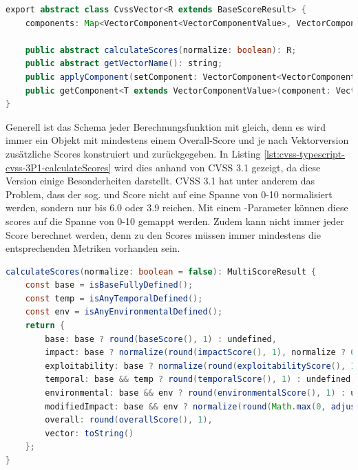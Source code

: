 \begin{lstlisting}[language=Java, label={lst:cvss-typescript-cvss-vector-class-attributes}, caption={CvssVector Klasse in TypeScript}, basicstyle=\scriptsize]
export abstract class CvssVector<R extends BaseScoreResult> {
    components: Map<VectorComponent<VectorComponentValue>, VectorComponentValue>;

    public abstract calculateScores(normalize: boolean): R;
    public abstract getVectorName(): string;
    public applyComponent(setComponent: VectorComponent<VectorComponentValue>, setValue: VectorComponentValue) { ... }
    public getComponent<T extends VectorComponentValue>(component: VectorComponent<T>): T { ... }
}
\end{lstlisting}

Generell ist das Schema jeder Berechnungsfunktion mit  gleich, denn es wird immer ein Objekt mit mindestens einem Overall-Score und je nach Vektorversion zusätzliche Scores konstruiert und zurückgegeben.
In Listing \ref{lst:cvss-typescript-cvss-3P1-calculateScores} wird dies anhand von CVSS 3.1 gezeigt, da diese Version einige Besonderheiten darstellt.
CVSS 3.1 hat unter anderem das Problem, dass der sog.  und  Score nicht auf eine Spanne von 0-10 normalisiert werden, sondern nur bis 6.0 oder 3.9 reichen.
Mit einem -Parameter können diese scores auf die Spanne von 0-10 gemappt werden.
Zudem kann nicht immer jeder Score berechnet werden, denn zu den Scores müssen immer mindestens die entsprechenden Metriken vorhanden sein.

\begin{lstlisting}[language=Java, label={lst:cvss-typescript-cvss-3P1-calculateScores}, caption={CVSS 3.1 Score-Berechnung in TypeScript}, basicstyle=\scriptsize]
calculateScores(normalize: boolean = false): MultiScoreResult {
    const base = isBaseFullyDefined();
    const temp = isAnyTemporalDefined();
    const env = isAnyEnvironmentalDefined();
    return {
        base: base ? round(baseScore(), 1) : undefined,
        impact: base ? normalize(round(impactScore(), 1), normalize ? 6.0 : 10) : undefined,
        exploitability: base ? normalize(round(exploitabilityScore(), 1), normalize ? 3.9 : 10) : undefined,
        temporal: base && temp ? round(temporalScore(), 1) : undefined,
        environmental: base && env ? round(environmentalScore(), 1) : undefined,
        modifiedImpact: base && env ? normalize(round(Math.max(0, adjustedImpactScore()), 1), normalize ? 6.1 : 10) : undefined,
        overall: round(overallScore(), 1),
        vector: toString()
    };
}
\end{lstlisting}

